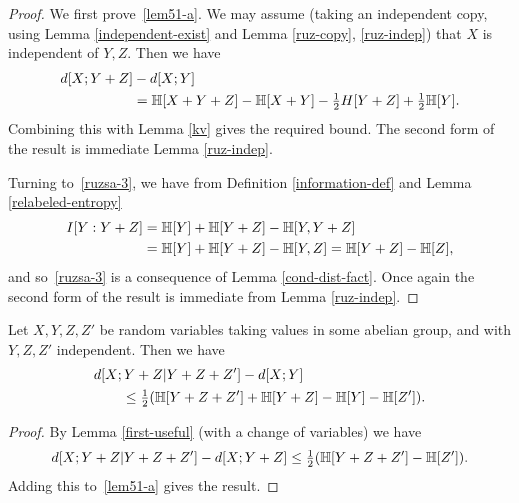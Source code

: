   \begin{proof}
  We first prove~\eqref{lem51-a}. We may assume (taking an independent copy, using Lemma \ref{independent-exist} and Lemma \ref{ruz-copy}, \ref{ruz-indep}) that $X$ is independent of $Y, Z$. Then we have
  \begin{align*}  d[X;Y+Z] & - d[X;Y] \\ & = \mathbb{H}[X + Y + Z] - \mathbb{H}[X+Y] - \tfrac{1}{2}H[Y + Z] + \tfrac{1}{2} \mathbb{H}[Y].\end{align*}
  Combining this with Lemma \ref{kv} gives the required bound. The second form of the result is immediate Lemma \ref{ruz-indep}.

  Turning to~\eqref{ruzsa-3}, we have from Definition \ref{information-def} and Lemma \ref{relabeled-entropy}
  \begin{align*} I[Y : Y+Z] & = \mathbb{H}[Y] + \mathbb{H}[Y + Z] - \mathbb{H}[Y, Y + Z] \\ & = \mathbb{H}[Y] + \mathbb{H}[Y + Z] - \mathbb{H}[Y, Z]  = \mathbb{H}[Y + Z] - \mathbb{H}[Z],\end{align*}
  and so~\eqref{ruzsa-3} is a consequence of Lemma \ref{cond-dist-fact}. Once again the second form of the result is immediate from Lemma \ref{ruz-indep}.
\end{proof}

\begin{lemma}\label{second-useful}
  Let $X, Y, Z, Z'$ be random variables taking values in some abelian group, and with $Y, Z, Z'$ independent. Then we have
  \begin{align}\nonumber
  & d[X;Y + Z | Y + Z + Z'] - d[X;Y] \\ & \qquad \leq \tfrac{1}{2} ( \mathbb{H}[Y + Z + Z'] + \mathbb{H}[Y + Z] - \mathbb{H}[Y] - \mathbb{H}[Z']).\label{7111}
  \end{align}
  \end{lemma}

  \begin{proof}
  By Lemma \ref{first-useful} (with a change of variables) we have
  \[ d[X; Y + Z | Y + Z + Z'] - d[X; Y + Z] \leq \tfrac{1}{2}( \mathbb{H}[Y + Z + Z'] - \mathbb{H}[Z']).\]
  Adding this to~\eqref{lem51-a} gives the result.
  \end{proof}
